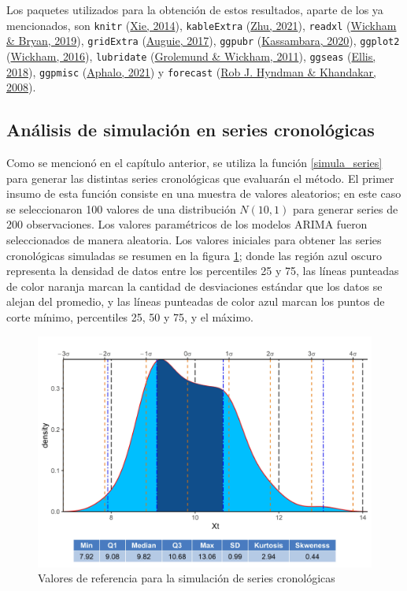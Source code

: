 \documentclass[
]{article}
\begin{document}
Los paquetes utilizados para la obtención de estos resultados, aparte de
los ya mencionados, son \texttt{knitr}
(\protect\hyperlink{ref-knitr}{Xie, 2014}), \texttt{kableExtra}
(\protect\hyperlink{ref-kableExtra}{Zhu, 2021}), \texttt{readxl}
(\protect\hyperlink{ref-readxl}{Wickham \& Bryan, 2019}),
\texttt{gridExtra} (\protect\hyperlink{ref-gridExtra}{Auguie, 2017}),
\texttt{ggpubr} (\protect\hyperlink{ref-ggpubr}{Kassambara, 2020}),
\texttt{ggplot2} (\protect\hyperlink{ref-ggplot2}{Wickham, 2016}),
\texttt{lubridate} (\protect\hyperlink{ref-lubridate}{Grolemund \&
Wickham, 2011}), \texttt{ggseas} (\protect\hyperlink{ref-ggseas}{Ellis,
2018}), \texttt{ggpmisc} (\protect\hyperlink{ref-ggpmisc}{Aphalo, 2021})
y \texttt{forecast} (\protect\hyperlink{ref-forecast}{Rob J. Hyndman \&
Khandakar, 2008}).

\subsection{Análisis de simulación en series cronológicas}

Como se mencionó en el capítulo anterior, se utiliza la función
\ref{simula_series} para generar las distintas series cronológicas que
evaluarán el método. El primer insumo de esta función consiste en una
muestra de valores aleatorios; en este caso se seleccionaron 100 valores
de una distribución \(N(10,1)\) para generar series de 200
observaciones. Los valores paramétricos de los modelos ARIMA fueron
seleccionados de manera aleatoria. Los valores iniciales para obtener
las series cronológicas simuladas se resumen en la figura
\ref{fig:datos_simulados}; donde las región azul oscuro representa la
densidad de datos entre los percentiles 25 y 75, las líneas punteadas de
color naranja marcan la cantidad de desviaciones estándar que los datos
se alejan del promedio, y las líneas punteadas de color azul marcan los
puntos de corte mínimo, percentiles 25, 50 y 75, y el máximo.

\begin{figure}[!h]
\includegraphics[width=1\linewidth,height=1\textheight]{Tesis_files/figure-latex/datos_simulados-1} \caption{Valores de referencia para la simulación de series cronológicas}\label{fig:datos_simulados}
\end{figure}
\end{document}
